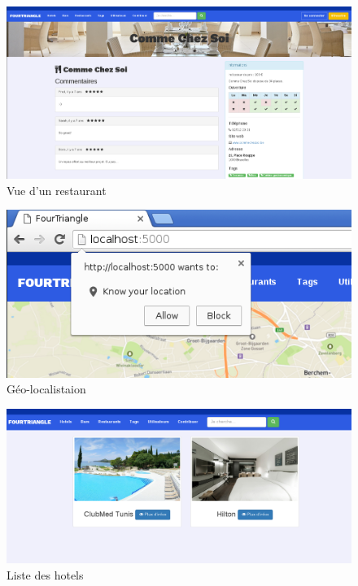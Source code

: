 \documentclass[10pt,a4paper]{article}
\begin{document}
\begin{center}
\begin{figure}[H]
   \includegraphics[width=15cm]{screen/resto.png}
   \caption{Vue d'un restaurant}
\end{figure}


\begin{figure}[H]
   \includegraphics[width=15cm]{screen/geoloc.png}
   \caption{Géo-localistaion}
\end{figure}


\begin{figure}[H]
   \includegraphics[width=15cm]{screen/list.png}
   \caption{Liste des hotels}
\end{figure}



\end{center}
\end{document}
